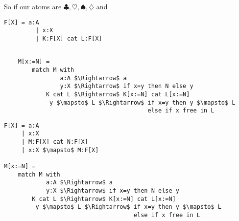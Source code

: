 So if our atoms are $\clubsuit,\heartsuit, \spadesuit,\diamondsuit$
and 
\begin{lstlisting}[language=Hidris,mathescape]
    F[X] = a:A 
         | x:X
         | K:F[X] cat L:F[X]
\end{lstlisting}

\begin{lstlisting}[language=Hidris,mathescape]

    M[x:=N] =
        match M with 
                a:A $\Rightarrow$ a
                y:X $\Rightarrow$ if x=y then N else y
            K cat L $\Rightarrow$ K[x:=N] cat L[x:=N]
             y $\mapsto$ L $\Rightarrow$ if x=y then y $\mapsto$ L 
                                         else if x free in L 
    \end{lstlisting}
    

\begin{lstlisting}[language=Sava,mathescape]
F[X] = a:A 
     | x:X
     | M:F[X] cat N:F[X]
     | x:X $\mapsto$ M:F[X]

M[x:=N] =
    match M with 
            a:A $\Rightarrow$ a
            y:X $\Rightarrow$ if x=y then N else y
        K cat L $\Rightarrow$ K[x:=N] cat L[x:=N]
         y $\mapsto$ L $\Rightarrow$ if x=y then y $\mapsto$ L 
                                     else if x free in L 
\end{lstlisting}


